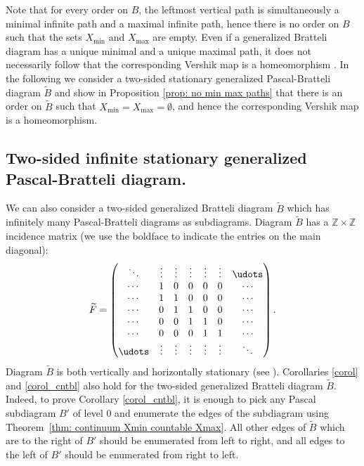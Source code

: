 \documentclass[11pt, twoside]{amsart}
\theoremstyle{definition}
\theoremstyle{remark}
\theoremstyle{plain}
\def\tl{\widetilde}
\numberwithin{equation}{section}
\begin{document}
Note that for every order on $B$, the leftmost vertical path is simultaneously a minimal infinite path and a maximal infinite path, hence there is no order on $B$ such that the sets $X_{\min}$ and $X_{\max}$ are empty. Even if a generalized Bratteli diagram has a unique minimal and a unique maximal path, it does not necessarily follow that the corresponding Vershik map is a homeomorphism \cite[Theorem 4.7]{BezuglyiJorgensenKarpelSanadhya2023}. In the following we consider a two-sided stationary generalized Pascal-Bratteli diagram $\tl B$ and show in Proposition \ref{prop: no min max paths} that there is an order on $\tl B$ such that $X_{\min} = X_{\max} = \emptyset$, and hence the corresponding Vershik map is a homeomorphism.

\subsection{Two-sided infinite stationary generalized Pascal-Bratteli diagram.}
We can also consider a two-sided generalized Bratteli diagram 
$\tl B$ which has infinitely many Pascal-Bratteli diagrams as subdiagrams.
Diagram $\tl B$ has a $\mathbb{Z} \times \mathbb{Z}$ incidence matrix (we use the boldface to indicate 
the entries on the main diagonal):
$$
\tl F = \begin{pmatrix}
   \ddots & \vdots 
   & \vdots & \vdots & \vdots & \vdots & \udots\\
    \cdots & \textbf 1 & 0 &  0 & 0 & 0 & \cdots\\
    \cdots & 1 & \textbf 1 &  0 & 0 & 0 & \cdots\\
    \cdots & 0 &  1 & \textbf{1} &  0 &   0 & \cdots\\
    \cdots & 0 & 0 &  1 & \textbf 1 & 0 & \cdots\\
    \cdots & 0 & 0 & 0 & 1 & \textbf 1 & \cdots\\
    \udots & \vdots & \vdots & \vdots & \vdots & \vdots & \ddots\\
\end{pmatrix}.
$$ 
Diagram $\tl B$ is both vertically and horizontally stationary (see \cite{BJKK_HS_2024}). Corollaries \ref{corol} and \ref{corol_cntbl} also hold for the two-sided generalized Bratteli diagram $\tl B$. Indeed, to prove Corollary \ref{corol_cntbl}, it is enough to pick any Pascal subdiagram $B'$ of level 0 and enumerate the edges of the subdiagram using Theorem~\ref{thm: continuum Xmin countable Xmax}. All other edges of $\tl B$ which are to the right of $B'$ should be enumerated from left to right, and all edges to the left of $B'$ should be enumerated from right to left.
\end{document}
